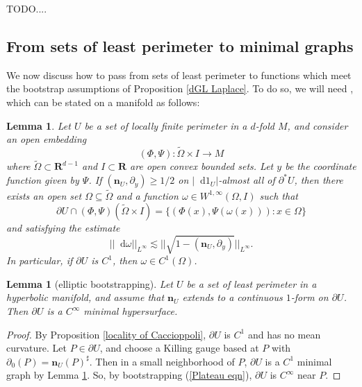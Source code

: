 \documentclass[reqno,10pt]{amsart}
\newcommand{\RR}{\mathbf{R}}
\newcommand*\dif{\mathop{}\!\mathrm{d}}
\newcommand{\normal}{\mathbf n}
\newtheorem{lemma}[theorem]{Lemma}
\theoremstyle{definition}
\numberwithin{equation}{section}
\begin{document}
TODO....


\subsection{From sets of least perimeter to minimal graphs}
We now discuss how to pass from sets of least perimeter to functions which meet the bootstrap assumptions of Proposition \ref{dGL Laplace}.
To do so, we will need \cite[Proposition 4.8]{Giusti77}, which can be stated on a manifold as follows:

\begin{lemma}\label{sets are graphs}
Let $U$ be a set of locally finite perimeter in a $d$-fold $M$, and consider an open embedding
\begin{equation}\label{coordinates for making a graph}
(\Phi, \Psi): \tilde \Omega \times I \to M
\end{equation}
where $\tilde \Omega \subset \RR^{d - 1}$ and $I \subset \RR$ are open convex bounded sets.
Let $y$ be the coordinate function given by $\Psi$.
If $(\normal_U, \partial_y) \geq 1/2$ on $|\dif 1_U|$-almost all of $\partial^* U$, then there exists an open set $\Omega \subseteq \tilde \Omega$ and a function $\omega \in W^{1, \infty}(\Omega, I)$ such that 
$$\partial U \cap (\Phi, \Psi)(\tilde \Omega \times I) = \{(\Phi(x), \Psi(\omega(x))): x \in \Omega\}$$
and satisfying the estimate 
\begin{equation}\label{estimate on dif omega}
||\dif \omega||_{L^\infty} \lesssim ||\sqrt{1 - (\normal_U, \partial_y)}||_{L^\infty}.
\end{equation}
In particular, if $\partial U$ is $C^1$, then $\omega \in C^1(\Omega)$.
\end{lemma}

\begin{lemma}[elliptic bootstrapping]\label{C1 implies smooth}
Let $U$ be a set of least perimeter in a hyperbolic manifold, and assume that $\normal_U$ extends to a continuous $1$-form on $\partial U$.
Then $\partial U$ is a $C^\infty$ minimal hypersurface.
\end{lemma}
\begin{proof}
By Proposition \ref{locality of Caccioppoli}, $\partial U$ is $C^1$ and has no mean curvature.
Let $P \in \partial U$, and choose a Killing gauge based at $P$ with $\partial_0(P) = \normal_U(P)^\sharp$.
Then in a small neighborhood of $P$, $\partial U$ is a $C^1$ minimal graph by Lemma \ref{sets are graphs}.
So, by bootstrapping (\ref{Plateau eqn}), $\partial U$ is $C^\infty$ near $P$.
\end{proof}
\end{document}
